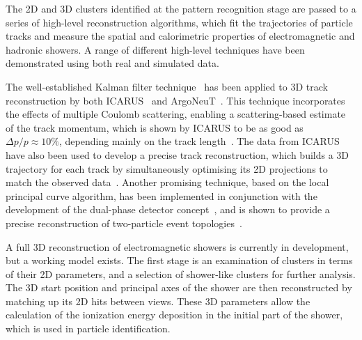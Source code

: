 

The 2D and 3D clusters identified at the pattern recognition stage
are passed to a series of high-level reconstruction algorithms,
which fit the trajectories of particle tracks and measure the
spatial and calorimetric properties of electromagnetic and hadronic showers.
A range of different high-level techniques have been demonstrated 
using both real and simulated data.

The well-established Kalman filter technique~\cite{kalman} has been applied
to 3D track reconstruction by both ICARUS~\cite{REF1} and ArgoNeuT~\cite{REF2}.
This technique incorporates the effects of multiple Coulomb scattering,
enabling a scattering-based estimate of the track momentum,
which is shown by ICARUS to be as good as $\Delta p/p \approx 10\%$, 
depending mainly on the track length~\cite{REF3}.
The data from ICARUS have also been used to develop a precise
track reconstruction, which builds a 3D trajectory for each track by simultaneously
optimising its 2D projections to match the observed data~\cite{Antonello:2012hu}.
Another promising technique, based on the local principal curve algorithm, 
has been implemented in conjunction with the development of the 
dual-phase detector concept~\cite{REF4}, and is shown to provide 
a precise reconstruction of two-particle event topologies~\cite{REF5}. 

A full 3D reconstruction of electromagnetic showers is currently in development,
but a working model exists. The first stage is an examination of clusters 
in terms of their 2D parameters, and a selection of shower-like clusters 
for further analysis. The 3D start position and principal axes of the shower 
are then reconstructed by matching up its 2D hits between views.
These 3D parameters allow the calculation of the ionization energy deposition
in the initial part of the shower, which is used in particle identification. 

